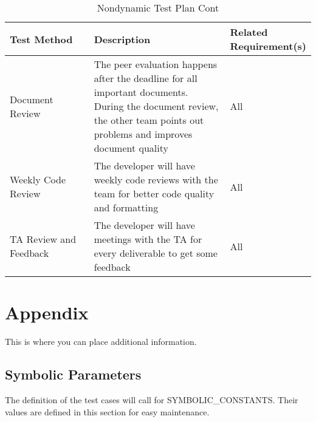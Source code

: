 \documentclass[12pt, titlepage]{article}
\begin{document}
\begin{table}[H]
\caption{Nondynamic Test Plan Cont}
\begin{tabular}{|p{0.3\linewidth} | p{0.5\linewidth}| p{0.2\linewidth} |}
\hline
\multicolumn{1}{|l}{\bfseries Test Method} & \multicolumn{1}{|l|}{\bfseries Description} & \multicolumn{1}{l|}{\bfseries Related Requirement(s)}\\
\hline
Document Review & The peer evaluation happens after the deadline for all important documents. During the document review, the other team points out problems and improves document quality & All\\
\hline
Weekly Code Review & The developer will have weekly code reviews with the team for better code quality and formatting & All\\
\hline
TA Review and Feedback & The developer will have meetings with the TA for every deliverable to get some feedback & All\\
\hline
\end{tabular}
\end{table}

\newpage

\section{Appendix}

This is where you can place additional information.

\subsection{Symbolic Parameters}

The definition of the test cases will call for SYMBOLIC\_CONSTANTS.
Their values are defined in this section for easy maintenance.
\end{document}
